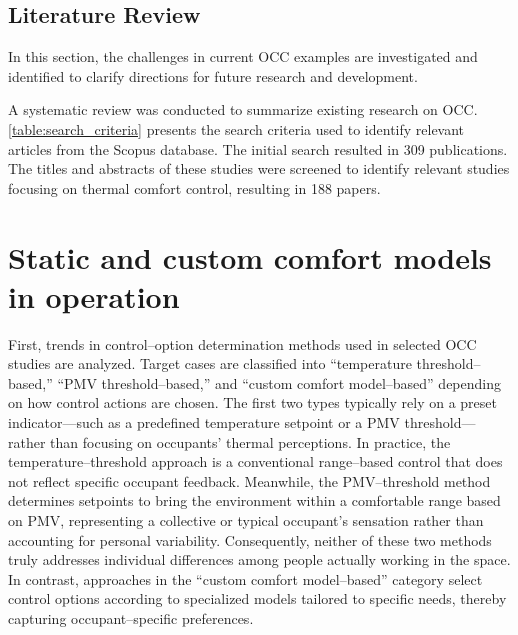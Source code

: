 
\subsection{Literature Review}
\label{sec:LitReview}

In this section, the challenges in current OCC examples are investigated and identified to clarify directions for future research and development.

A systematic review was conducted to summarize existing research on OCC.
\autoref{table:search_criteria} presents the search criteria used to identify relevant articles from the Scopus database. 
The initial search resulted in 309 publications.
The titles and abstracts of these studies were screened to identify relevant studies focusing on thermal comfort control, resulting in 188 papers. 

\begin{table}[pos=!bt]
  \centering
  
  \caption{Search criteria for paper selection}
  \label{table:search_criteria}
\end{table}

\section{Static and custom comfort models in operation}
\label{subsec:StaticandCustom}

First, trends in control–option determination methods used in selected OCC studies are analyzed.
Target cases are classified into “temperature threshold–based,” “PMV threshold–based,” and “custom comfort model–based” depending on how control actions are chosen.
The first two types typically rely on a preset indicator—such as a predefined temperature setpoint or a PMV threshold—rather than focusing on occupants’ thermal perceptions. 
In practice, the temperature–threshold approach is a conventional range–based control that does not reflect specific occupant feedback. 
Meanwhile, the PMV–threshold method determines setpoints to bring the environment within a comfortable range based on PMV, representing a collective or typical occupant’s sensation rather than accounting for personal variability. 
Consequently, neither of these two methods truly addresses individual differences among people actually working in the space. 
In contrast, approaches in the “custom comfort model–based” category select control options according to specialized models tailored to specific needs, thereby capturing occupant–specific preferences.

